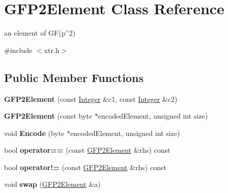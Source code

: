 \hypertarget{class_g_f_p2_element}{
\section{GFP2Element Class Reference}
\label{class_g_f_p2_element}
}


an element of GF(p$^\wedge$2)  


{\ttfamily \#include $<$xtr.h$>$}\subsection*{Public Member Functions}
\begin{DoxyCompactItemize}
\item 
\hypertarget{class_g_f_p2_element_a84a4bc1c9a98320fb2ba422e726220be}{
{\bfseries GFP2Element} (const \hyperlink{class_integer}{Integer} \&c1, const \hyperlink{class_integer}{Integer} \&c2)}
\label{class_g_f_p2_element_a84a4bc1c9a98320fb2ba422e726220be}

\item 
\hypertarget{class_g_f_p2_element_a198afbefc4f5f22eb2c3a1c67dd103b3}{
{\bfseries GFP2Element} (const byte $\ast$encodedElement, unsigned int size)}
\label{class_g_f_p2_element_a198afbefc4f5f22eb2c3a1c67dd103b3}

\item 
\hypertarget{class_g_f_p2_element_ab5c1499bcfd8c52cbc145384aded0363}{
void {\bfseries Encode} (byte $\ast$encodedElement, unsigned int size)}
\label{class_g_f_p2_element_ab5c1499bcfd8c52cbc145384aded0363}

\item 
\hypertarget{class_g_f_p2_element_a135a9031fc9da0c7f3c12fb02d9b65f8}{
bool {\bfseries operator==} (const \hyperlink{class_g_f_p2_element}{GFP2Element} \&rhs) const }
\label{class_g_f_p2_element_a135a9031fc9da0c7f3c12fb02d9b65f8}

\item 
\hypertarget{class_g_f_p2_element_a9c817544061af4fcbe5d96974f6d15db}{
bool {\bfseries operator!=} (const \hyperlink{class_g_f_p2_element}{GFP2Element} \&rhs) const }
\label{class_g_f_p2_element_a9c817544061af4fcbe5d96974f6d15db}

\item 
\hypertarget{class_g_f_p2_element_aaea0eacbd2dd61465f95c09690a3f89e}{
void {\bfseries swap} (\hyperlink{class_g_f_p2_element}{GFP2Element} \&a)}
\label{class_g_f_p2_element_aaea0eacbd2dd61465f95c09690a3f89e}

\end{DoxyCompactItemize}
